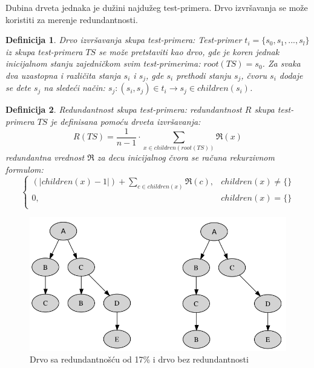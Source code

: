 \documentclass[a4paper]{article}
\newtheorem{definition}{Definicija}[section]
\begin{document}
Dubina drveta jednaka je dužini najdužeg test-primera. Drvo izvršavanja se može koristiti za merenje redundantnosti.

\begin{definition}{Drvo izvršavanja skupa test-primera:}
Test-primer $t_i = \{s_0, s_1, ..., s_l\}$ iz skupa test-primera $TS$ se može pretstaviti kao drvo, gde je koren jednak inicijalnom stanju zajedničkom svim test-primerima: $root(TS) = s_0$. Za svaka dva uzastopna i različita stanja $s_i$ i $s_j$, gde $s_i$ prethodi stanju $s_j$, čvoru $s_i$ dodaje se dete $s_j$ na sledeći način: $s_j: (s_i, s_j) \in t_i \rightarrow s_j \in children(s_i)$.
\end{definition}

\begin{definition}{Redundantnost skupa test-primera:}
redundantnost $R$ skupa test-primera $TS$ je definisana pomoću drveta izvršavanja:
\begin{equation}
\label{eq:suma}
    R(TS) = \frac{1}{n-1} \cdot \sum_{x \in children(root(TS))} \Re(x)
\end{equation}
redundantna vrednost $\Re$ za decu inicijalnog čvora se računa rekurzivnom formulom:
$$
    \begin{cases}
    (|children(x)-1|) + \sum_{c \in children(x)} \Re(c),  &  children(x) \neq \{\} \\
    0, &  children(x) = \{\} \\
    \end{cases}
$$
\end{definition}

\begin{figure}[h!]
\begin{center}
\includegraphics[scale=0.25]{redudancy.png}
\end{center}
\caption{Drvo sa redundantnošću od 17\% i drvo bez redundantnosti}
\label{fig:redundancy}
\end{figure}
\end{document}
